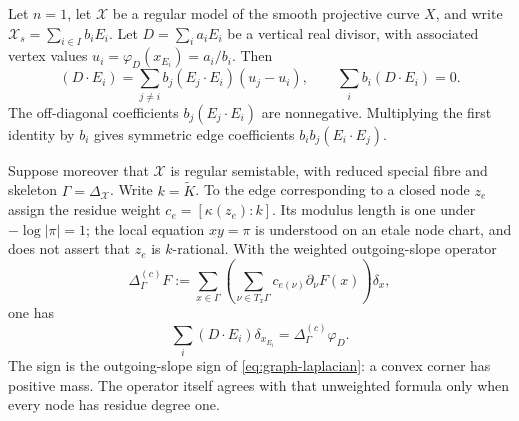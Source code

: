 \begin{proposition}
\label{prop:ch20-curve-laplacian}
Let \(n=1\), let \(\mathcal X\) be a regular model of the smooth projective
curve \(X\), and write \(\mathcal X_s=\sum_{i\in I}b_iE_i\).  Let
\(D=\sum_i a_iE_i\) be a vertical real divisor, with associated
vertex values \(u_i=\varphi_D(x_{E_i})=a_i/b_i\).  Then
\begin{equation}
\label{eq:ch20-curve-laplacian}
 (D\cdot E_i)=\sum_{j\ne i}b_j(E_j\cdot E_i)(u_j-u_i),
 \qquad \sum_i b_i(D\cdot E_i)=0.
\end{equation}
The off-diagonal coefficients \(b_j(E_j\cdot E_i)\) are nonnegative.
Multiplying the first identity by \(b_i\) gives symmetric edge
coefficients \(b_i b_j(E_i\cdot E_j)\).

Suppose moreover that \(\mathcal X\) is regular semistable, with reduced
special fibre and skeleton \(\Gamma=\Delta_{\mathcal X}\).
Write \(k=\widetilde K\).  To the edge corresponding to a closed node
\(z_e\) assign the residue weight \(c_e=[\kappa(z_e):k]\).
Its modulus length is one under \(-\log|\pi|=1\); the local equation
\(xy=\pi\) is understood on an etale node chart, and does not assert
that \(z_e\) is \(k\)-rational.  With the weighted outgoing-slope
operator
\[
 \Delta^{(c)}_\Gamma F
   :=\sum_{x\in\Gamma}
       \left(\sum_{\nu\in T_x\Gamma}
                   c_{e(\nu)}\partial_\nu F(x)\right)\delta_x,
\]
one has
\begin{equation}
\label{eq:ch20-curve-laplacian-graph}
 \sum_i(D\cdot E_i)\delta_{x_{E_i}}
                 =\Delta^{(c)}_\Gamma\varphi_D.
\end{equation}
The sign is the outgoing-slope sign of \eqref{eq:graph-laplacian}:
a convex corner has positive mass.  The operator itself agrees with
that unweighted formula only when every node has residue degree one.
\end{proposition}

